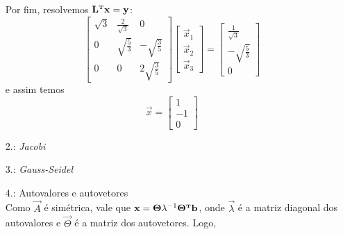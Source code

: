\documentclass{homework}
\begin{document}
\begin{enumerate}[wide, leftmargin=80pt]
			Por fim, resolvemos $\mathbf{L}^{\text{\bfseries\tiny T}} \mathbf{x} = \mathbf{y}$:
			$$\begin{bmatrix}
			\sqrt{3} & \frac{2}{\sqrt{3}}& 0\\
			0 & \sqrt {\frac{5}{3}} & - \sqrt {\frac{3}{5}}\\
			0 & 0 & 2\sqrt {\frac{3}{5}}
			\end{bmatrix} \begin{bmatrix}
			\vec{x}_1\\
			\vec{x}_2\\
			\vec{x}_3
			\end{bmatrix} = \begin{bmatrix}
			\frac{1}{\sqrt{3}}\\
			-\sqrt{\frac{5}{3}}\\
			0
			\end{bmatrix}
			$$
			e assim temos $$\vec{x} = \begin{bmatrix}
			1\\
			-1\\
			0
			\end{bmatrix}$$
			
			\item[2.: \textit{Jacobi}]~\\
			
			\item[3.: \textit{Gauss-Seidel}]~\\
			
			\item[4.: Autovalores e autovetores]~\\
			
			Como $\vec{A}$ é simétrica, vale que $\mathbf{x} = \mathbf{\Theta}\mathbf{\lambda}^{-1}\mathbf{\Theta}^{\text{\bfseries\tiny T}} \mathbf{b}$, onde $\vec{\lambda}$ é a matriz diagonal dos autovalores e $\vec{\Theta}$ é a matriz dos autovetores. Logo,
			

\end{enumerate}
\end{document}
